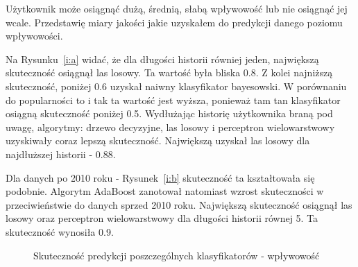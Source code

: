 \documentclass[polish,12pt]{aghthesis}
\begin{document}
Użytkownik może osiągnąć dużą, średnią, słabą wpływowość lub nie osiągnąć jej wcale. Przedstawię miary jakości jakie uzyskałem do predykcji danego poziomu wpływowości.

Na Rysunku~\ref{i:a} widać, że dla długości historii równiej jeden, największą skuteczność osiągnął las losowy. Ta wartość była bliska 0.8. Z kolei najniższą skuteczność, poniżej 0.6 uzyskał naiwny klasyfikator bayesowski. W porównaniu do popularności to i tak ta wartość jest wyższa, ponieważ tam tan klasyfikator osiągną skuteczność poniżej 0.5. Wydłużając historię użytkownika braną pod uwagę, algorytmy: drzewo decyzyjne, las losowy i perceptron wielowarstwowy uzyskiwały coraz lepszą skuteczność. Największą uzyskał las losowy dla najdłuższej historii - 0.88. 

Dla danych po 2010 roku - Rysunek~\ref{i:b} skuteczność ta kształtowała się podobnie. Algorytm AdaBoost zanotował natomiast wzrost skuteczności w przeciwieństwie do danych sprzed 2010 roku. Największą skuteczność osiągnął las losowy oraz perceptron wielowarstwowy dla długości historii równej 5. Ta skuteczność wynosiła 0.9.

\begin{figure}[htp] 
    \centering
    \hfill%
    \caption{Skuteczność predykcji poszczególnych klasyfikatorów - wpływowość}
\end{figure}
\FloatBarrier
\end{document}
